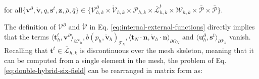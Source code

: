 \documentclass[english,11pt,3p,number,sort&compress]{elsarticle}
\begin{document}
\noindent for all$\{\bm{v}^\partial,\mathring{\bm{v}}, q, \bm{s}^t, \bm{z}, \bar{\rho}, \bar{q} \} \in \{\mathcal{V}^\partial_{h,k} \times \mathring{\mathcal{V}}_{h,k} \times \mathcal{P}_{h,k} \times \bar{\mathcal{L}}^t_{h,k} \times \mathcal{W
}_{h,k} \times \bar{\mathcal{P}} \times \bar{\mathcal{P}}\}$.

The definition of $\mathcal{V}^\partial \text{ and } \mathring{\mathcal{V}}$ in Eq. \eqref{eq:internal-external-functions} directly implies that the terms $\langle\bm{t}^t_h,\bm{v}^\partial\rangle_{\partial\mathcal{T}_h}, b( p_h, \mathring{\bm{v}}_h)_{\mathcal{T}_h}, \langle\bm{t}_N\cdot\bm{n},\mathring{\bm{v}}_h\cdot\bm{n}\rangle_{\partial\Omega_N} \text{ and }\langle\bm{u}^\partial_h,\bm{s}^t\rangle_{\partial\mathcal{T}_h}$ vanish. Recalling that $\bm{t}^t \in \bar{\mathcal{L}}_{h,k}$ is discontinuous over the mesh skeleton, meaning that it can be computed from a single element in the mesh, the problem of Eq. \eqref{eq:double-hybrid-six-field} can be rearranged in matrix form as:
\vspace{0.8cm}
\end{document}

